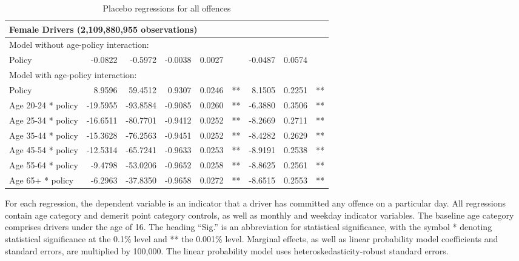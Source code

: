 \begin{table}
\begin{tabular}{l r r r r l r r l}
\hline 

\multicolumn{8}{l}{\textbf{Female Drivers} (2,109,880,955  observations)} \\ 

\hline
\multicolumn{8}{l}{Model without age-policy interaction: } \\ 
Policy                   &  -0.0822        &  -0.5972       &  -0.0038        &  0.0027       &            &  -0.0487        &  0.0574       &            \\ 
\hline
\multicolumn{8}{l}{Model with age-policy interaction: } \\ 
Policy                   &  8.9596        &  59.4512       &  0.9307        &  0.0246       &   **       &  8.1505        &  0.2251       &   **       \\ 
Age 20-24 * policy   &  -19.5955        &  -93.8584       &  -0.9085        &  0.0260       &   **       &  -6.3880        &  0.3506       &   **       \\ 
Age 25-34 * policy   &  -16.6511        &  -80.7701       &  -0.9412        &  0.0252       &   **       &  -8.2669        &  0.2711       &   **       \\ 
Age 35-44 * policy   &  -15.3628        &  -76.2563       &  -0.9451        &  0.0252       &   **       &  -8.4282        &  0.2629       &   **       \\ 
Age 45-54 * policy   &  -12.5314        &  -65.7241       &  -0.9633        &  0.0253       &   **       &  -8.9191        &  0.2538       &   **       \\ 
Age 55-64 * policy   &  -9.4798        &  -53.0206       &  -0.9652        &  0.0258       &   **       &  -8.8625        &  0.2561       &   **       \\ 
Age 65+ * policy   &  -6.2963        &  -37.8350       &  -0.9658        &  0.0272       &   **       &  -8.6515        &  0.2553       &   **       \\ 

\hline 

\end{tabular} 
\caption{Placebo regressions for all offences} 
For each regression, the dependent variable is an indicator that a driver has committed  
any offence on a particular day.  
All regressions contain age category and demerit point category controls, 
as well as monthly and weekday indicator variables. 
The baseline age category comprises drivers under the age of 16. 
The heading ``Sig.'' is an abbreviation for statistical significance, with 
the symbol * denoting statistical significance at the 0.1\% level 
and ** the 0.001\% level. 
Marginal effects, as well as linear probability model coefficients and standard errors, are  
multiplied by 100,000.  
The linear probability model uses heteroskedasticity-robust standard errors. 
\label{tab:seas_Logit_vs_LPMx100K_placebo_regs} 
\end{table} 
 
